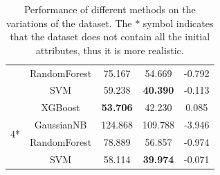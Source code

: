 \documentclass[conference,compsoc]{IEEEtran}
\begin{document}
\begin{table}[!t]
\begin{tabular}{c|c|c|c|c}
& RandomForest & 75.167 & 54.669 & -0.792 \\
& SVM & 59.238 & \textbf{40.390} & -0.113 \\
\hline
\multirow{4}{*}{4*}
& XGBoost & \textbf{53.706} & 42.230 & 0.085 \\
& GaussianNB & 124.868 & 109.788 & -3.946 \\
& RandomForest & 78.889 & 56.857 & -0.974 \\
& SVM & 58.114 & \textbf{39.974} & -0.071 \\
\end{tabular}
\renewcommand{\arraystretch}{1.3}
\caption{Performance of different methods on the variations of the dataset. The $*$ symbol indicates that the dataset does not contain all the initial attributes, thus it is more realistic.}
\label{model_performance}
\end{table}



\end{document}

